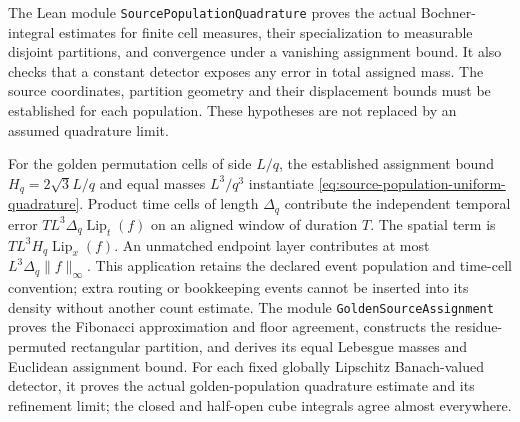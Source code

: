 The Lean module \texttt{SourcePopulationQuadrature} proves the actual
Bochner-integral estimates for finite cell measures, their specialization
to measurable disjoint partitions, and convergence under a vanishing
assignment bound. It also checks that a constant detector exposes any
error in total assigned mass. The source coordinates, partition geometry
and their displacement bounds must be established for each population.
These hypotheses are not replaced by an assumed quadrature limit.

For the golden permutation cells of side $L/q$, the established assignment
bound $H_q=2\sqrt3L/q$ and equal masses $L^3/q^3$ instantiate
\eqref{eq:source-population-uniform-quadrature}. Product time cells of
length $\Delta_q$ contribute the independent temporal error
$TL^3\Delta_q\operatorname{Lip}_t(f)$ on an aligned window of duration
$T$. The spatial term is $TL^3H_q\operatorname{Lip}_x(f)$.
An unmatched endpoint layer contributes at most
$L^3\Delta_q\|f\|_\infty$. This application retains the declared event
population and time-cell convention; extra routing or bookkeeping events
cannot be inserted into its density without another count estimate.
The module \texttt{GoldenSourceAssignment} proves the Fibonacci
approximation and floor agreement, constructs the residue-permuted
rectangular partition, and derives its equal Lebesgue masses and Euclidean
assignment bound. For each fixed globally Lipschitz Banach-valued detector,
it proves the actual golden-population quadrature estimate and its
refinement limit; the closed and half-open cube integrals agree almost
everywhere.

